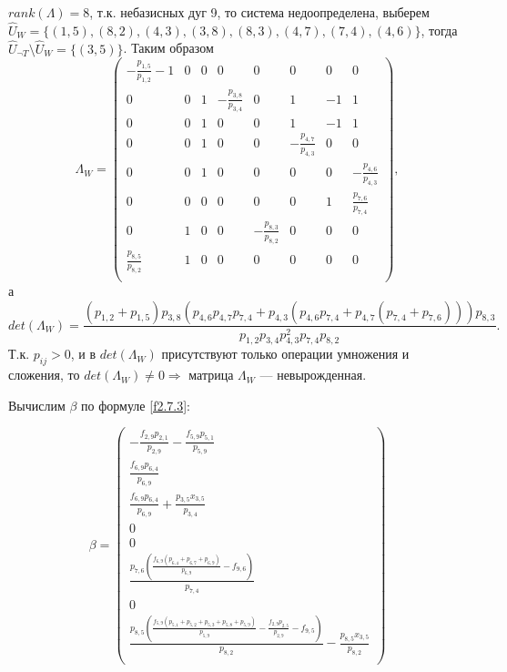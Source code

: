 \documentclass[14pt]{extarticle}%
\begin{document}
$rank(\Lambda)=8$, т.к. небазисных дуг 9, то система недоопределена, выберем $\widehat{U}_W=\{(1 , 5), (8 , 2), (4 , 3), (3, 8), (8 , 3), (4 , 7), (7 , 4), (4 , 6)\}$, тогда $\widehat{U}_{\neg T}\setminus\widehat{U}_W=\{(3,5)\}$. Таким образом 
$$\Lambda_W=\left(
\begin{array}{cccccccc}
 -\frac{p_{1,5}}{p_{1,2}}-1 & 0 & 0 & 0 & 0 & 0 & 0 & 0 \\
 0 & 0 & 1 & -\frac{p_{3,8}}{p_{3,4}} & 0 & 1 & -1 & 1 \\
 0 & 0 & 1 & 0 & 0 & 1 & -1 & 1 \\
 0 & 0 & 1 & 0 & 0 & -\frac{p_{4,7}}{p_{4,3}} & 0 & 0 \\
 0 & 0 & 1 & 0 & 0 & 0 & 0 & -\frac{p_{4,6}}{p_{4,3}} \\
 0 & 0 & 0 & 0 & 0 & 0 & 1 & \frac{p_{7,6}}{p_{7,4}} \\
 0 & 1 & 0 & 0 & -\frac{p_{8,3}}{p_{8,2}} & 0 & 0 & 0 \\
 \frac{p_{8,5}}{p_{8,2}} & 1 & 0 & 0 & 0 & 0 & 0 & 0 \\
\end{array}
\right),$$
а 
$$det(\Lambda_W)=\frac{\left(p_{1,2}+p_{1,5}\right) p_{3,8} \left(p_{4,6} p_{4,7} p_{7,4}+p_{4,3} \left(p_{4,6} p_{7,4}+p_{4,7} \left(p_{7,4}+p_{7,6}\right)\right)\right) p_{8,3}}{p_{1,2} p_{3,4} p_{4,3}^2 p_{7,4} p_{8,2}}.$$
Т.к. $p_{ij}>0$, и в $det(\Lambda_W)$ присутствуют только операции умножения и сложения, то  $det(\Lambda_W)\neq 0 \Rightarrow$ матрица $\Lambda_W$ --- невырожденная. 

Вычислим $\beta$ по формуле \eqref{f2.7.3}:

\begin{equation}
	\beta=\left(
\begin{array}{c}
 -\frac{f_{2,9} p_{2,1}}{p_{2,9}}-\frac{f_{5,9} p_{5,1}}{p_{5,9}} \\
 \frac{f_{6,9} p_{6,4}}{p_{6,9}} \\
 \frac{f_{6,9} p_{6,4}}{p_{6,9}}+\frac{p_{3,5} x_{3,5}}{p_{3,4}} \\
 0 \\
 0 \\
 \frac{p_{7,6} \left(\frac{f_{6,9} \left(p_{6,4}+p_{6,7}+p_{6,9}\right)}{p_{6,9}}-f_{9,6}\right)}{p_{7,4}} \\
 0 \\
 \frac{p_{8,5} \left(\frac{f_{5,9} \left(p_{5,1}+p_{5,2}+p_{5,3}+p_{5,8}+p_{5,9}\right)}{p_{5,9}}-\frac{f_{2,9} p_{2,5}}{p_{2,9}}-f_{9,5}\right)}{p_{8,2}}-\frac{p_{8,5} x_{3,5}}{p_{8,2}} \\
\end{array}
\right)
\end{equation}
\end{document}
